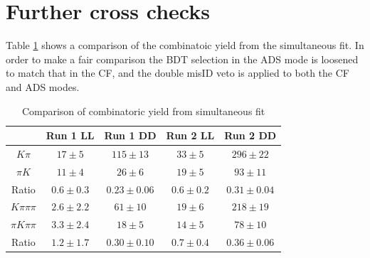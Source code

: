 %
%
%

\newpage
\clearpage

\section{Further cross checks}

Table \ref{combinatoricyields} shows a comparison of the combinatoic yield from the simultaneous fit. In order to make a fair comparison the BDT selection in the ADS mode is loosened to match that in the CF, and the double misID veto is applied to both the CF and ADS modes.

\begin{table}[!h]
\centering
\begin{tabular}{c|cccc}
& Run 1 LL & Run 1 DD & Run 2 LL & Run 2 DD \\
\hline
$K\pi$ & $17 \pm 5$ & $115 \pm 13$ & $33 \pm 5$ & $296 \pm 22$ \\
$\pi K$ & $11 \pm 4$ & $26 \pm 6$ & $19 \pm 5$ & $93 \pm 11$ \\
\hline
Ratio & $0.6 \pm 0.3$ & $0.23 \pm 0.06$ & $0.6 \pm 0.2$ & $0.31 \pm 0.04$ \\
\hline
$K\pi\pi\pi$ & $2.6 \pm 2.2$ & $61 \pm 10$ & $19 \pm 6$ & $218 \pm 19$ \\
$\pi K\pi\pi$ & $3.3 \pm 2.4$ & $18 \pm 5$ & $14 \pm 5$ & $78 \pm 10$ \\
\hline
Ratio & $1.2 \pm 1.7$ & $0.30 \pm 0.10$ & $0.7 \pm 0.4$ & $0.36 \pm 0.06$ \\
\hline
\end{tabular}
\caption{Comparison of combinatoric yield from simultaneous fit}
\label{combinatoricyields}
\end{table}

